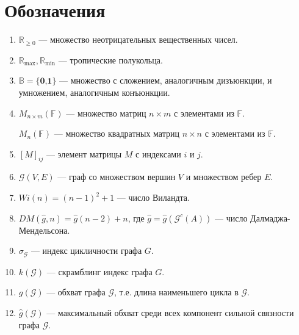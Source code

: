\documentclass[12pt]{article}
\begin{document}
\section{Обозначения}
\begin{enumerate}
    \item ${\mathbb{R}_{\geq0}}$ --- множество неотрицательных вещественных чисел.
    
    \item $\mathbb{R}_{\max}, \mathbb{R}_{\min}$ --- тропические полукольца.
   
    \item $\mathbb{B} = \{\textbf{0,1}\}$ --- множество с сложением, аналогичным дизъюнкции, и умножением, аналогичным конъюнкции.
    
    \item $M_{n \times m}(\mathbb{F})$ --- множество матриц $n \times m$ с элементами из $\mathbb{F}$.
    
    $M_n(\mathbb{F})$ --- множество квадратных матриц $n \times n$ с элементами из $\mathbb{F}$.
    
    \item $[M]_{ij}$ --- элемент матрицы $M$ с индексами $i$ и $j$.
    
    \item ${\mathcal{G}(V,E)}$ --- граф со множеством вершин $V$ и множеством ребер $E$.
    
    \item $Wi(n) = (n - 1)^2 + 1$ --- число Виландта.
    
    \item $DM(\hat{g}, n) =  \hat{g}(n - 2) + n$, где $\hat{g} = \hat{g}(\mathcal{G}^c(A))$ --- число Далмаджа-Мендельсона.
    

    
    \item $\sigma_\mathcal{G}$ --- индекс цикличности графа $G$.
    
    \item $k(\mathcal{G})$ --- скрамблинг индекс графа $G$.
    
    \item $g(\mathcal{G})$ --- обхват графа $\mathcal{G}$, т.е. длина наименьшего цикла в $\mathcal{G}$.
    
    \item $\hat{g}(\mathcal{G})$ --- максимальный обхват среди всех компонент сильной связности графа $\mathcal{G}$.
    

\end{enumerate}
\end{document}
